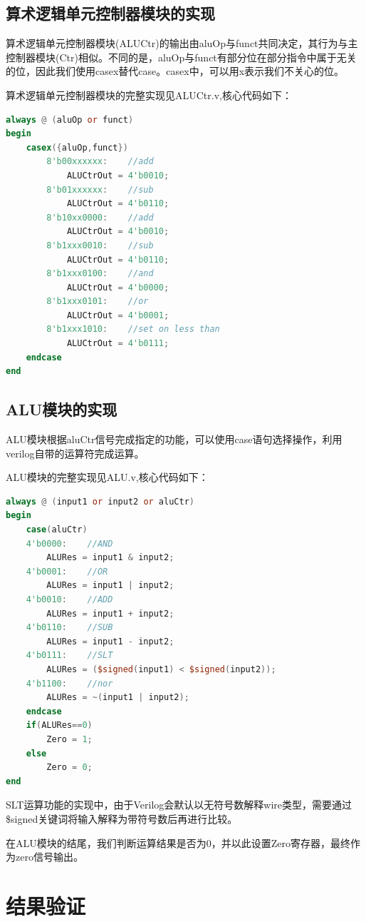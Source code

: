 \documentclass[UTF8]{ctexart}
\begin{document}
\subsection{算术逻辑单元控制器模块的实现}
算术逻辑单元控制器模块(ALUCtr)的输出由aluOp与funct共同决定，其行为与主控制器模块(Ctr)相似。不同的是，aluOp与funct有部分位在部分指令中属于无关的位，因此我们使用casex替代case。casex中，可以用x表示我们不关心的位。\par
算术逻辑单元控制器模块的完整实现见ALUCtr.v,核心代码如下：
\begin{lstlisting}[language=verilog]
always @ (aluOp or funct)
begin
    casex({aluOp,funct})
        8'b00xxxxxx:    //add
            ALUCtrOut = 4'b0010;
        8'b01xxxxxx:    //sub
            ALUCtrOut = 4'b0110;
        8'b10xx0000:    //add
            ALUCtrOut = 4'b0010;
        8'b1xxx0010:    //sub
            ALUCtrOut = 4'b0110;
        8'b1xxx0100:    //and
            ALUCtrOut = 4'b0000;
        8'b1xxx0101:    //or
            ALUCtrOut = 4'b0001;
        8'b1xxx1010:    //set on less than
            ALUCtrOut = 4'b0111;
    endcase
end
\end{lstlisting}
\subsection{ALU模块的实现}
ALU模块根据aluCtr信号完成指定的功能，可以使用case语句选择操作，利用verilog自带的运算符完成运算。\par
ALU模块的完整实现见ALU.v,核心代码如下：
\begin{lstlisting}[language=verilog]
always @ (input1 or input2 or aluCtr)
begin
    case(aluCtr)
    4'b0000:    //AND
        ALURes = input1 & input2;
    4'b0001:    //OR
        ALURes = input1 | input2;
    4'b0010:    //ADD
        ALURes = input1 + input2;
    4'b0110:    //SUB
        ALURes = input1 - input2;
    4'b0111:    //SLT
        ALURes = ($signed(input1) < $signed(input2));
    4'b1100:    //nor
        ALURes = ~(input1 | input2);
    endcase
    if(ALURes==0)
        Zero = 1;
    else
        Zero = 0;
end
\end{lstlisting}\par
SLT运算功能的实现中，由于Verilog会默认以无符号数解释wire类型，需要通过\$signed关键词将输入解释为带符号数后再进行比较。\par
在ALU模块的结尾，我们判断运算结果是否为0，并以此设置Zero寄存器，最终作为zero信号输出。
\section{结果验证}\label{sec3}
\end{document}
